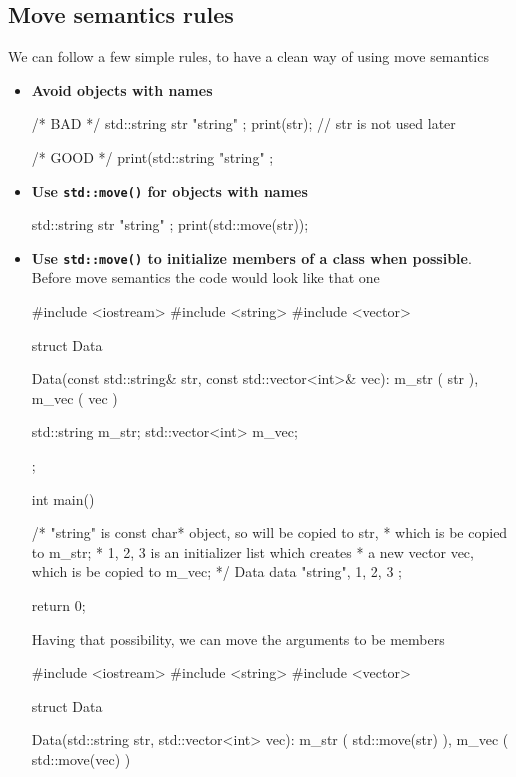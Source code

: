 \documentclass[../main]{subfiles}
\begin{document}
\subsection{Move semantics rules}
    We can follow a few simple rules, to have a clean way of using move semantics
\begin{itemize}
    \item \textbf{Avoid objects with names}
    \begin{Code}
        /* BAD */
        std::string str { "string" };
        print(str);
        // str is not used later


        /* GOOD */
        print(std::string { "string" };
    \end{Code}
    \item \textbf{Use \texttt{std::move()} for objects with names}
    \begin{Code}
        std::string str { "string" };
        print(std::move(str));
    \end{Code}
    \item \textbf{Use \texttt{std::move()} to initialize members of a class when possible}. Before move semantics the code would look like that one
    \begin{Code}
        #include <iostream>
        #include <string>
        #include <vector>
        
        struct Data
        {
            Data(const std::string& str, const std::vector<int>& vec):
                m_str ( str ),
                m_vec ( vec )
            {
            }
        
            std::string m_str;
            std::vector<int> m_vec;
        };
        
        int main()
        {
            /* "string" is const char* object, so will be copied to str,
             * which is be copied to m_str;
             * {1, 2, 3} is an initializer list which creates
             * a new vector vec, which is be copied to m_vec;
             */
            Data data { "string", {1, 2, 3} };
        
            return 0;
        }
    \end{Code}
    \noindent
    Having that possibility, we can move the arguments to be members
    \begin{Code}
        #include <iostream>
        #include <string>
        #include <vector>
        
        struct Data
        {
            Data(std::string str, std::vector<int> vec):
                m_str ( std::move(str) ),
                m_vec ( std::move(vec) )
            {
            }
        
}
\end{Code}
\end{itemize}
\end{document}
